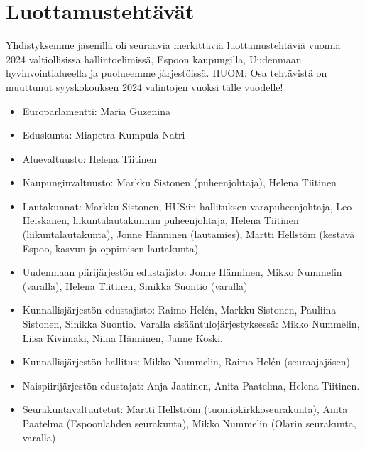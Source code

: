 \documentclass[a4paper,12pt]{article}
\begin{document}
\section{Luottamustehtävät}
Yhdistyksemme jäsenillä oli seuraavia merkittäviä luottamustehtäviä vuonna 2024 valtiollisissa hallintoelimissä, Espoon kaupungilla, Uudenmaan hyvinvointialueella ja puolueemme järjestöissä. HUOM: Osa tehtävistä on muuttunut syyskokouksen 2024 valintojen vuoksi tälle vuodelle!
\begin{itemize}
\item{Europarlamentti:} Maria Guzenina
\item{Eduskunta:} Miapetra Kumpula-Natri
\item{Aluevaltuusto:} Helena Tiitinen
\item{Kaupunginvaltuusto:} Markku Sistonen (puheenjohtaja), Helena Tiitinen
\item{Lautakunnat:} Markku Sistonen, HUS:in hallituksen varapuheenjohtaja, Leo Heiskanen, liikuntalautakunnan puheenjohtaja, Helena Tiitinen (liikuntalautakunta), Jonne Hänninen (lautamies), Martti Hellstöm (kestävä Espoo, kasvun ja oppimisen lautakunta)
\item{Uudenmaan piirijärjestön edustajisto:} Jonne Hänninen, Mikko Nummelin (varalla), Helena Tiitinen, Sinikka Suontio (varalla)
\item{Kunnallisjärjestön edustajisto:} Raimo Helén, Markku Sistonen, Pauliina Sistonen, Sinikka Suontio. Varalla sisääntulojärjestyksessä: Mikko Nummelin, Liisa Kivimäki, Niina Hänninen, Janne Koski.
\item{Kunnallisjärjestön hallitus:} Mikko Nummelin, Raimo Helén (seuraajajäsen)
\item{Naispiirijärjestön edustajat:} Anja Jaatinen, Anita Paatelma, Helena Tiitinen.
\item{Seurakuntavaltuutetut:} Martti Hellström (tuomiokirkkoseurakunta), Anita Paatelma (Espoonlahden seurakunta), Mikko Nummelin (Olarin seurakunta, varalla)
\end{itemize}
\end{document}
